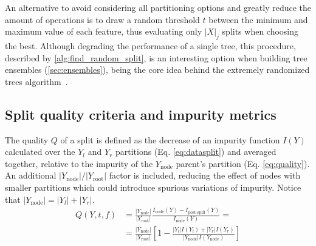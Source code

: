 An alternative to avoid considering all partitioning options and greatly reduce the amount of operations is to draw a random threshold $t$ between the minimum and maximum value of each feature, thus evaluating only $|X|_j$ splits when choosing the best. Although degrading the performance of a single tree, this procedure, described by \ref{alg:find_random_split}, is an interesting option when building tree ensembles (\autoref{sec:ensembles}), being the core idea behind the extremely randomized trees algorithm~\cite{geurts2006extremely}.

%


\subsection{Split quality criteria and impurity metrics}
\label{sec:criteria}

The quality $Q$ of a split is defined as the decrease of an impurity function $I(Y)$ calculated over the $Y_l$ and $Y_r$ partitions (Eq. \ref{eq:datasplit}) and averaged together, relative to the impurity of the $Y_\text{node}$ parent's partition (Eq. \ref{eq:quality}). An additional $|Y_\text{node}|/|Y_\text{root}|$ factor is included, reducing the effect of nodes with smaller partitions which could introduce spurious variations of impurity. Notice that $|Y_\text{node}|=|Y_l|+|Y_r|$.
%
\begin{equation}
    \begin{split}
    Q(Y, t, f)
        &=
            \frac{|Y_\text{node}|}{|Y_\text{root}|}
            \frac{I_\text{node}(Y)-I_{\text{post-split}}(Y)}{I_\text{node}(Y)} =\\
        &=
            \frac{|Y_\text{node}|}{|Y_\text{root}|}
            \left[
                1
                - \frac{|Y_l| I(Y_l)+ |Y_r|I(Y_r)}
                    {|Y_\text{node}|I(Y_\text{node})}
            \right]
    \end{split}
    \label{eq:quality}
\end{equation}

